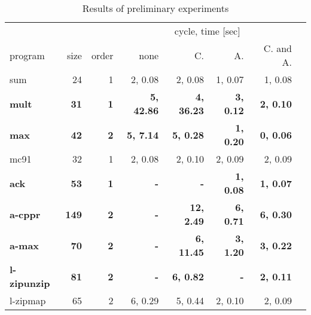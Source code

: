 \begin{table}
\caption{Results of preliminary experiments}
\label{tbl:exp}
\begin{center}
\begin{tabular}{|l|r|r|r|r|r|r|r|}
\hline
            &       &    & \multicolumn{4}{|c|}{cycle, time [sec]} \\
\cline{4-7}
program    & size & order & none &     C. &   A. &    C. and A. \\
\hline
 sum        &    24&      1& 2,  0.08 & 2,  0.08 & 1,  0.07 & 1,  0.08 \\
\bf mult       &\bf    31&\bf      1&\bf 5, 42.86 &\bf 4, 36.23 &\bf 3,  0.12 &\bf 2,  0.10 \\
\bf max        &\bf    42&\bf      2&\bf 5,  7.14 &\bf 5,  0.28 &\bf 1,  0.20 &\bf 0,  0.06 \\
 mc91       &    32&      1& 2,  0.08 & 2,  0.10 & 2,  0.09 & 2,  0.09 \\
\bf ack        &\bf    53&\bf      1&\bf        - &\bf        - &\bf 1,  0.08 &\bf 1,  0.07 \\
\bf a-cppr     &\bf   149&\bf      2&\bf        - &\bf 12, 2.49 &\bf 6,  0.71 &\bf 6,  0.30 \\
\bf a-max      &\bf    70&\bf      2&\bf        - &\bf 6, 11.45 &\bf 3,  1.20 &\bf 3,  0.22 \\
\bf l-zipunzip &\bf    81&\bf      2&\bf        - &\bf 6,  0.82 &\bf        - &\bf 2,  0.11 \\
 l-zipmap   &    65&      2& 6,  0.29 & 5,  0.44 & 2,  0.10 & 2,  0.09 \\

\end{tabular}
\end{center}
\end{table}

